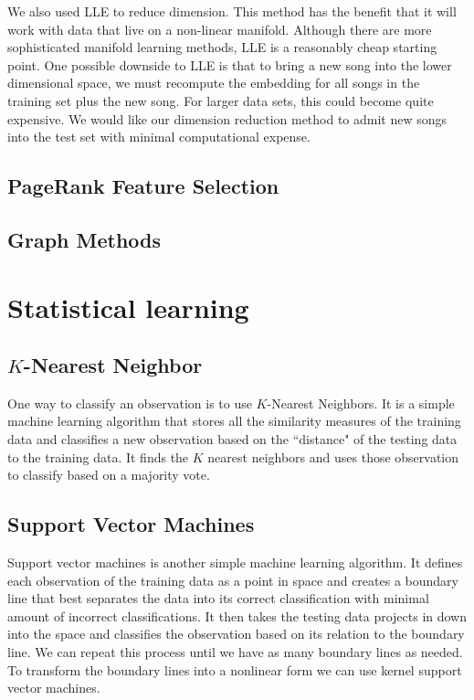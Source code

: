 \documentclass[12pt]{article}
\begin{document}
We also used LLE to reduce dimension.  This method has the benefit that it will work with data that live on a non-linear manifold.  Although there are more sophisticated manifold learning methods, LLE is a reasonably cheap starting point.  One possible downside to LLE is that to bring a new song into the lower dimensional space, we must recompute the embedding for all songs in the training set plus the new song.  For larger data sets, this could become quite expensive.  We would like our dimension reduction method to admit new songs into the test set with minimal computational expense.\\

\subsection*{PageRank Feature Selection}

\subsection*{Graph Methods}

\section{Statistical learning}
\subsection{$K$-Nearest Neighbor}
One way to classify an observation is to use $K$-Nearest Neighbors. It is a simple machine learning algorithm that stores all the similarity measures of the training data and classifies a new observation based on the ``distance" of the testing data to the training data. It finds the  $K$ nearest neighbors and uses those observation to classify based on a majority vote. 

\subsection{Support Vector Machines}
Support vector machines is another simple machine learning algorithm. It defines each observation of the training data as a point in space and creates a boundary line that best separates the data into its correct classification with minimal amount of incorrect classifications. It then takes the testing data projects in down into the space and classifies the observation based on its relation to the boundary line. We can repeat this process until we have as many boundary lines as needed. To transform the boundary lines into a nonlinear form we can use kernel support vector machines.
\end{document}
